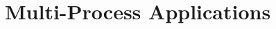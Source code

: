 

\begin{comment}
\vspace{5pt}
\noindent{\bf Guest self-migration.~}  One of the key features of the host ABI
is that guest state can be programmatically read and recreated.
As a result, guests can checkpoint, migrate, and resume themselves in a new picoprocess,
potentially on a new host.  
Most of the library OS and application state are checkpointed simply 
by copying the contents of virtual memory into a file.
Checkpointing requires manually serializing a few key data structures
in {\tt libLinux} that are needed to resume the library OS from a checkpoint,
including the thread states, handle table, and memory mappings.  

Resuming from a checkpoint involves restoring these key data
structures (handles, thread register contexts, memory mappings), and re-loading memory
contents from the checkpoint.  Most additional data structures
in {\tt libLinux}, and all application data structures,
are reloaded at the virtual address as before the checkpoint and work without modification.
\end{comment}

\begin{comment}
When a new guest begins execution, an input argument to {\tt libLinux} indicates
whether control should be transferred to the Linux loader ({\tt ld.so}) to start a new application instance, 
or whether a checkpoint should be loaded instead.
\end{comment}


\section{Multi-Process Applications} 

